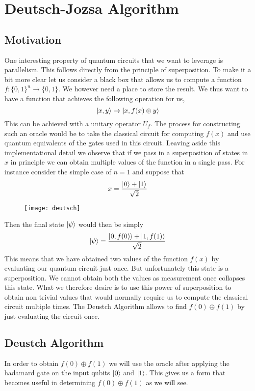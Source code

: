 \section{Deutsch-Jozsa Algorithm}

\subsection{Motivation}

One interesting property of quantum circuits that we want to leverage is parallelism. This follows directly from the principle of superposition. To make it a bit more clear let us consider a black box that allows us to compute a function $f: \{0, 1\}^n \to \{0, 1\}$. We however need a place to store the result. We thus want to have a function that achieves the following operation for us,
$$ \ket{x,y} \to \ket{x, f(x)\oplus y}$$
This can be achieved with a unitary operator $U_f$. The process for constructing such an oracle would be to take the classical circuit for computing $f(x)$ and use quantum equivalents of the gates used in this circuit. Leaving aside this implementational detail we observe that if we pass in a superposition of states in $x$ in principle we can obtain multiple values of the function in a single pass.
For instance consider the simple case of $n = 1$ and suppose that
$$ x = \frac{\ket{0} + \ket{1}}{\sqrt{2}}$$

\begin{figure}[htp]
    \centering
    \texttt{[image: deutsch]}
\end{figure}

Then the final state $\ket{\psi}$ would then be simply
$$\ket{\psi} = \frac{\ket{0, f(0)} + \ket{1, f(1)}}{\sqrt{2}}$$
This means that we have obtained two values of the function $f(x)$ by evaluating our quantum circuit just once. But unfortunately this state is a superposition. We cannot obtain both the values as measurement once collapses this state. What we therefore desire is to use this power of superposition to obtain non trivial values that would normally require us to compute the classical circuit multiple times. The Deustch Algorithm allows to find $f(0) \oplus f(1)$ by just evaluating the circuit once.

\subsection{Deustch Algorithm}

In order to obtain $f(0) \oplus f(1)$ we will use the oracle after applying the hadamard gate on the input qubits $\ket{0}$ and $\ket{1}$. This gives us a form that becomes useful in determining $f(0) \oplus f(1)$ as we will see.

